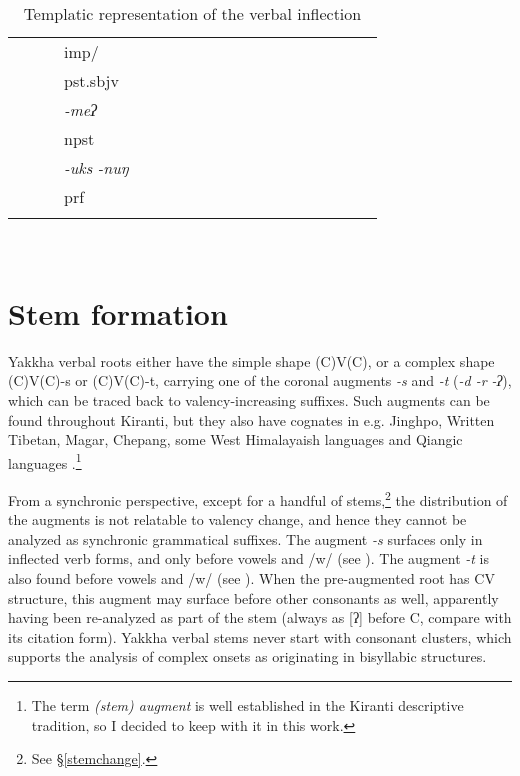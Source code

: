 \begin{landscape}
\begin{table}[p]
{{\begin{tabular}{lllllllllllllllllll}
	&										&			&	\sc imp/&				&						&						&						&						&					&				&			&				&				&			&				&					&				&				\\
	&										&			&	\sc pst.sbjv&			&						&						&						&						&					&				&			&				&				&			&				&					&				&				\\
	&										&			&	\emph{-meʔ}&			&						&						&						&						&					&				&			&				&				&			&				&					&				&				\\
	&										&			&	\sc npst&				&						&						&						&						&					&				&			&				&				&			&				&					&				&				\\
	&										&			&	\emph{-uks\,\ti\,-nuŋ}&	&						&						&						&						&					&				&			&				&				&			&				&					&				&				\\
	&										&			&	\sc prf&				&						&						&						&						&					&				&			&				&				&			&				&					&				&				\\
	\lspbottomrule																																																																																		
\end{tabular}\\
}
}
\caption{Templatic representation of the verbal inflection}\label{xyz}
\end{table} 


\end{landscape}


\pagestyle{scrheadings}

\section{Stem formation}\label{stem}

Yakkha verbal roots either have the simple shape (C)V(C), or a complex shape (C)V(C)-s or (C)V(C)-t, carrying one of the coronal augments  \emph{-s} and \emph{-t} (\emph{\ti -d \ti -r \ti -ʔ}), which can be traced back to valency-increasing suffixes. Such augments can be found throughout Kiranti, but they also have cognates in e.g. Jinghpo, Written Tibetan, Magar, Chepang, some West Himalayaish languages and Qiangic languages \citep[457-59]{Matisoff2003Handbook}.\footnote{The term \emph{(stem) augment} is well established in the Kiranti descriptive tradition, so I decided to keep with it in this work.} 

From a synchronic perspective, except for a handful of stems,\footnote{See §\ref{stemchange}.} the distribution of the augments is not relatable to valency change, and hence they cannot be analyzed as synchronic grammatical suffixes. The augment \emph{-s} surfaces only in inflected verb forms, and only before vowels and /w/ (see \Next[a]). The augment \emph{-t} is also found before vowels and /w/ (see \Next[b]). When the pre-augmented root has CV structure, this augment may surface before other consonants as well, apparently having been re-analyzed as part of the  stem (always as [ʔ] before C, compare \Next[c] with its citation form). Yakkha verbal stems never start with consonant clusters, which supports the analysis of complex onsets as originating in bisyllabic structures. 

